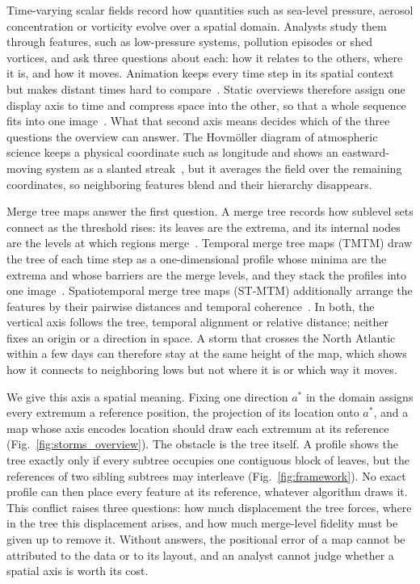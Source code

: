 \maketitle
\raggedbottom
\setlength{\emergencystretch}{1.5em}
Time-varying scalar fields record how quantities such as sea-level pressure, aerosol concentration or vorticity evolve over a spatial domain. Analysts study them through features, such as low-pressure systems, pollution episodes or shed vortices, and ask three questions about each: how it relates to the others, where it is, and how it moves. Animation keeps every time step in its spatial context but makes distant times hard to compare~\cite{Tversky:2002:Animation,Robertson:2008:Animation}. Static overviews therefore assign one display axis to time and compress space into the other, so that a whole sequence fits into one image~\cite{Bach:2017:STC}. What that second axis means decides which of the three questions the overview can answer. The Hovm\"oller diagram of atmospheric science keeps a physical coordinate such as longitude and shows an eastward-moving system as a slanted streak~\cite{Hovmoller:1949}, but it averages the field over the remaining coordinates, so neighboring features blend and their hierarchy disappears.

Merge tree maps answer the first question. A merge tree records how sublevel sets connect as the threshold rises: its leaves are the extrema, and its internal nodes are the levels at which regions merge~\cite{Heine:2016:Survey,Edelsbrunner:2002:TPS}. Temporal merge tree maps (TMTM) draw the tree of each time step as a one-dimensional profile whose minima are the extrema and whose barriers are the merge levels, and they stack the profiles into one image~\cite{Koepp:2023:TMTM}. Spatiotemporal merge tree maps (ST-MTM) additionally arrange the features by their pairwise distances and temporal coherence~\cite{STMTM:2026}. In both, the vertical axis follows the tree, temporal alignment or relative distance; neither fixes an origin or a direction in space. A storm that crosses the North Atlantic within a few days can therefore stay at the same height of the map, which shows how it connects to neighboring lows but not where it is or which way it moves.

We give this axis a spatial meaning. Fixing one direction $a^*$ in the domain assigns every extremum a reference position, the projection of its location onto $a^*$, and a map whose axis encodes location should draw each extremum at its reference (Fig.~\ref{fig:storms_overview}). The obstacle is the tree itself. A profile shows the tree exactly only if every subtree occupies one contiguous block of leaves, but the references of two sibling subtrees may interleave (Fig.~\ref{fig:framework}). No exact profile can then place every feature at its reference, whatever algorithm draws it. This conflict raises three questions: how much displacement the tree forces, where in the tree this displacement arises, and how much merge-level fidelity must be given up to remove it. Without answers, the positional error of a map cannot be attributed to the data or to its layout, and an analyst cannot judge whether a spatial axis is worth its cost.

